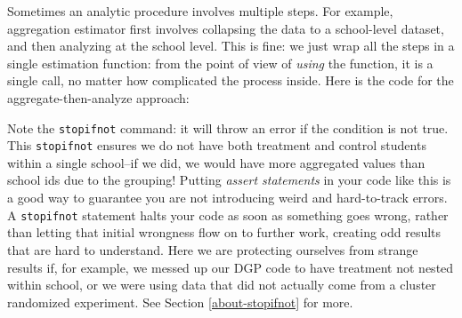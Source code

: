 \documentclass[
]{book}
\newenvironment{Shaded}{\begin{snugshade}}{\end{snugshade}}
\newcommand{\AttributeTok}[1]{\textcolor[rgb]{0.13,0.29,0.53}{#1}}
\newcommand{\ControlFlowTok}[1]{\textcolor[rgb]{0.13,0.29,0.53}{\textbf{#1}}}
\newcommand{\DecValTok}[1]{\textcolor[rgb]{0.00,0.00,0.81}{#1}}
\newcommand{\FunctionTok}[1]{\textcolor[rgb]{0.13,0.29,0.53}{\textbf{#1}}}
\newcommand{\NormalTok}[1]{#1}
\newcommand{\OtherTok}[1]{\textcolor[rgb]{0.56,0.35,0.01}{#1}}
\newcommand{\SpecialCharTok}[1]{\textcolor[rgb]{0.81,0.36,0.00}{\textbf{#1}}}
\newcommand{\StringTok}[1]{\textcolor[rgb]{0.31,0.60,0.02}{#1}}
\begin{document}
Sometimes an analytic procedure involves multiple steps.
For example, aggregation estimator first involves collapsing the data to a school-level dataset, and then analyzing at the school level.
This is fine: we just wrap all the steps in a single estimation function: from the point of view of \emph{using} the function, it is a single call, no matter how complicated the process inside.
Here is the code for the aggregate-then-analyze approach:

\begin{Shaded}
\end{Shaded}

Note the \texttt{stopifnot} command: it will throw an error if the condition is not true.
This \texttt{stopifnot} ensures we do not have both treatment and control students within a single school--if we did, we would have more aggregated values than school ids due to the grouping!
Putting \emph{assert statements} in your code like this is a good way to guarantee you are not introducing weird and hard-to-track errors.
A \texttt{stopifnot} statement halts your code as soon as something goes wrong, rather than letting that initial wrongness flow on to further work, creating odd results that are hard to understand.
Here we are protecting ourselves from strange results if, for example, we messed up our DGP code to have treatment not nested within school, or we were using data that did not actually come from a cluster randomized experiment.
See Section \ref{about-stopifnot} for more.
\end{document}
